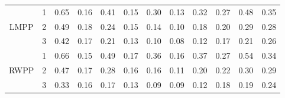 \documentclass[journal]{IEEEtran}
\begin{document}
\begin{table}[htbp]
{\begin{tabular}{|c|c|c c|c c|c c|c c|c c|}
            \multirow{3}{*}{LMPP} 
& 1 & 0.65 & 0.16 & 0.41 & 0.15 & 0.30 & 0.13 & 0.32 & 0.27 & 0.48 & 0.35\\ \cline{2-12}
& 2 & 0.49 & 0.18 & 0.24 & 0.15 & 0.14 & 0.10 & 0.18 & 0.20 & 0.29 & 0.28\\ \cline{2-12}
& 3 & 0.42 & 0.17 & 0.21 & 0.13 & 0.10 & 0.08 & 0.12 & 0.17 & 0.21 & 0.26\\ \cline{2-12}
            \hline\hline
            
            \multirow{3}{*}{RWPP} 
& 1 & 0.66 & 0.15 & 0.49 & 0.17 & 0.36 & 0.16 & 0.37 & 0.27 & 0.54 & 0.34\\ \cline{2-12}
& 2 & 0.47 & 0.17 & 0.28 & 0.16 & 0.16 & 0.11 & 0.20 & 0.22 & 0.30 & 0.29\\ \cline{2-12}
& 3 & 0.33 & 0.16 & 0.17 & 0.13 & 0.09 & 0.09 & 0.12 & 0.18 & 0.19 & 0.24\\ \cline{2-12}
            \hline
            
        \end{tabular}
    }
    \label{tab:algae_comparison_results}
    \end{table}





\end{document}
